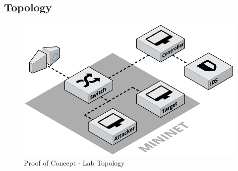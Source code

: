 \textcolor{dimgray}{\lipsum}


\subsection{Topology}
\label{subsec:topology}

\textcolor{dimgray}{\lipsum[1]}

\begin{figure}[h!]
    \centering
    \includegraphics[scale=0.28]{assets/figures/chapter3/PoC_topology.png}
    \caption{Proof of Concept - Lab Topology}
    \label{fig:poc-topology}
\end{figure}

\textcolor{dimgray}{\lipsum[1]}
